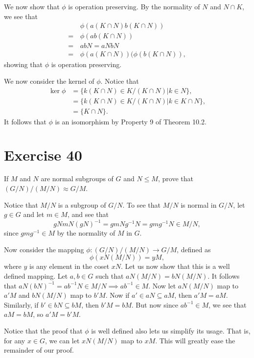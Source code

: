 \documentclass[12pt]{article}
\begin{document}
We now show that $\phi$ is operation preserving.
By the normality of $N$ and $N\cap K$, we see that
\begin{align*}
 & \phi(a(K\cap N)b(K\cap N)) \\
=\,& \phi(ab(K\cap N)) \\
 =\,& abN=aNbN \\
 =\,& \phi(a(K\cap N))(\phi(b(K\cap N)),
\end{align*}
showing that $\phi$ is operation preserving.

We now consider the kernel of $\phi$.  Notice that
\begin{align*}
\ker\phi &= \{k(K\cap N)\in K/(K\cap N)|k\in N\}, \\
 &= \{k(K\cap N)\in K/(K\cap N)|k\in K\cap N\}, \\
 &= \{K\cap N\}.
\end{align*}
It follows that $\phi$ is an isomorphism by Property 9
of Theorem 10.2.

\section*{Exercise 40}

If $M$ and $N$ are normal subgroups of $G$ and $N\leq M$, prove
that $(G/N)/(M/N)\approx G/M$.

Notice that $M/N$ is a subgroup of $G/N$.  To see that $M/N$ is normal in $G/N$,
let $g\in G$ and let $m\in M$, and see that
\begin{equation*}
gNmN(gN)^{-1}=gmNg^{-1}N=gmg^{-1}N\in M/N,
\end{equation*}
since $gmg^{-1}\in M$ by the normality of $M$ in $G$.

Now consider the mapping $\phi:(G/N)/(M/N)\to G/M$, defined as
\begin{equation*}
\phi(xN(M/N))=yM,
\end{equation*}
where $y$ is any element in the coset $xN$.  Let us now show that
this is a well defined mapping.  Let $a,b\in G$ such that
$aN(M/N)=bN(M/N)$.  It follows that $aN(bN)^{-1}=ab^{-1}N\in M/N\implies ab^{-1}\in M$.
Now let $aN(M/N)$ map to $a'M$ and $bN(M/N)$ map to $b'M$.
Now if $a'\in aN\subseteq aM$, then $a'M=aM$.
Similarly, if $b'\in bN\subseteq bM$, then $b'M=bM$.
But now since $ab^{-1}\in M$, we see that $aM=bM$, so $a'M=b'M$.

Notice that the proof that $\phi$ is well defined also lets us simplify its usage.
That is, for any $x\in G$, we can let $xN(M/N)$ map to $xM$.  This will greatly
ease the remainder of our proof.
\end{document}
